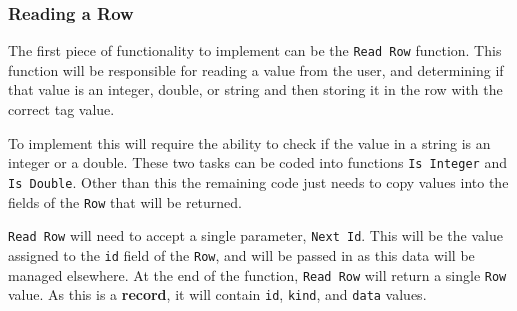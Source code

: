
\subsubsection{Reading a Row} %
\label{ssub:reading_a_row}

The first piece of functionality to implement can be the \texttt{Read Row} function. This function will be responsible for reading a value from the user, and determining if that value is an integer, double, or string and then storing it in the row with the correct tag value.

To implement this will require the ability to check if the value in a string is an integer or a double. These two tasks can be coded into functions \texttt{Is Integer} and \texttt{Is Double}. Other than this the remaining code just needs to copy values into the fields of the \texttt{Row} that will be returned.

\texttt{Read Row} will need to accept a single parameter, \texttt{Next Id}. This will be the value assigned to the \texttt{id} field of the \texttt{Row}, and will be passed in as this data will be managed elsewhere. At the end of the function, \texttt{Read Row} will return a single \texttt{Row} value. As this is a \textbf{record}, it will contain \texttt{id}, \texttt{kind}, and \texttt{data} values.

